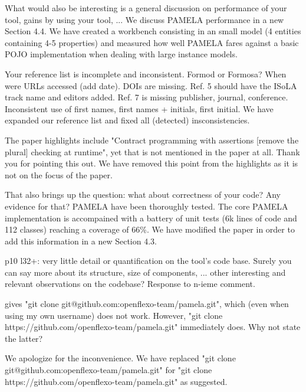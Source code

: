 \documentclass[10pt]{article}
\begin{document}
\begin{response}{What would also be interesting is a general discussion on performance of your tool, gains by using your tool, ...
} We discuss PAMELA performance in a new Section 4.4. We have created a workbench consisting in an small model (4 entities containing 4-5 properties) and measured how well PAMELA fares against a basic POJO implementation when dealing with large instance models.
\end{response}

\begin{response}{Your reference list is incomplete and inconsistent. Formod or Formosa? When were URLs accessed (add date). DOIs are missing. Ref. 5 should have the ISoLA track name and editors added. Ref. 7 is missing publisher, journal, conference. Inconsistent use of first names, first names + initials, first initial.}
We have expanded our reference list and fixed all (detected) insconsistencies.
\end{response}

\begin{response}{The paper highlights include "Contract programming with assertions [remove the plural] checking at runtime", yet that is not mentioned in the paper at all.
} Thank you for pointing this out. We have removed this point from the highlights as it is not on the focus of the paper.
\end{response}

\begin{response}{That also brings up the question: what about correctness of your code? Any evidence for that?}
PAMELA have been thoroughly tested. The core PAMELA implementation is accompained with a battery of unit tests (6k lines of code and 112 classes) reaching a coverage of 66\%. We have modified the paper in order to add this information in a new Section 4.3.
\end{response}

\begin{response}{p10 l32+: very little detail or quantification on the tool's code base. Surely you can say more about its structure, size of components, ... other interesting and relevant observations on the codebase?}
  Response to n-ieme comment.
\end{response}


\begin{response}{gives "git clone git@github.com:openflexo-team/pamela.git", which (even when using my own username) does not work. However, "git clone https://github.com/openflexo-team/pamela.git" immediately does. Why not state the latter?
}

We apologize for the inconvenience. We have replaced "git clone git@github.com:openflexo-team/pamela.git" for "git clone https://github.com/openflexo-team/pamela.git" as suggested.
\end{response}
\end{document}
